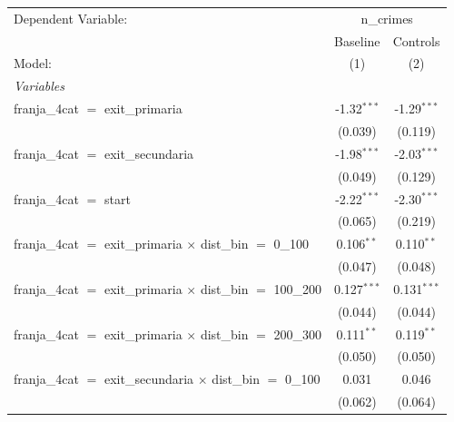 
\begingroup
\centering
\begin{tabular}{lcc}
   \tabularnewline \midrule \midrule
   Dependent Variable: & \multicolumn{2}{c}{n\_crimes}\\
                                                                          & Baseline       & Controls \\   
   Model:                                                                 & (1)            & (2)\\  
   \midrule
   \emph{Variables}\\
   franja\_4cat $=$ exit\_primaria                                        & -1.32$^{***}$  & -1.29$^{***}$\\   
                                                                          & (0.039)        & (0.119)\\   
   franja\_4cat $=$ exit\_secundaria                                      & -1.98$^{***}$  & -2.03$^{***}$\\   
                                                                          & (0.049)        & (0.129)\\   
   franja\_4cat $=$ start                                                 & -2.22$^{***}$  & -2.30$^{***}$\\   
                                                                          & (0.065)        & (0.219)\\   
   franja\_4cat $=$ exit\_primaria $\times$ dist\_bin $=$ 0\_100          & 0.106$^{**}$   & 0.110$^{**}$\\   
                                                                          & (0.047)        & (0.048)\\   
   franja\_4cat $=$ exit\_primaria $\times$ dist\_bin $=$ 100\_200        & 0.127$^{***}$  & 0.131$^{***}$\\   
                                                                          & (0.044)        & (0.044)\\   
   franja\_4cat $=$ exit\_primaria $\times$ dist\_bin $=$ 200\_300        & 0.111$^{**}$   & 0.119$^{**}$\\   
                                                                          & (0.050)        & (0.050)\\   
   franja\_4cat $=$ exit\_secundaria $\times$ dist\_bin $=$ 0\_100        & 0.031          & 0.046\\   
                                                                          & (0.062)        & (0.064)\\   

\end{tabular}
